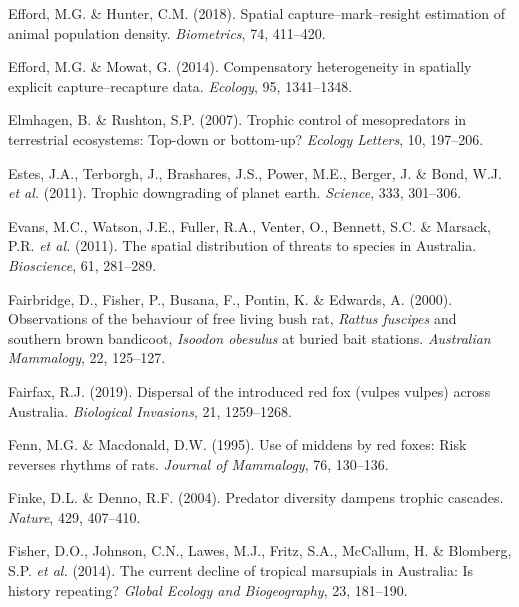 \documentclass[11pt,a4paper,titlepage,twoside,openright]{style/unimelbthesis}
\begin{document}
\begin{mainmatter}
\leavevmode\hypertarget{ref-efford2018spatial}{}%
Efford, M.G. \& Hunter, C.M. (2018). Spatial capture--mark--resight estimation of animal population density. \emph{Biometrics}, 74, 411--420.

\leavevmode\hypertarget{ref-efford2014compensatory}{}%
Efford, M.G. \& Mowat, G. (2014). Compensatory heterogeneity in spatially explicit capture--recapture data. \emph{Ecology}, 95, 1341--1348.

\leavevmode\hypertarget{ref-elmhagen2007trophic}{}%
Elmhagen, B. \& Rushton, S.P. (2007). Trophic control of mesopredators in terrestrial ecosystems: Top-down or bottom-up? \emph{Ecology Letters}, 10, 197--206.

\leavevmode\hypertarget{ref-estes2011trophic}{}%
Estes, J.A., Terborgh, J., Brashares, J.S., Power, M.E., Berger, J. \& Bond, W.J. \emph{et al.} (2011). Trophic downgrading of planet earth. \emph{Science}, 333, 301--306.

\leavevmode\hypertarget{ref-evans2011spatial}{}%
Evans, M.C., Watson, J.E., Fuller, R.A., Venter, O., Bennett, S.C. \& Marsack, P.R. \emph{et al.} (2011). The spatial distribution of threats to species in Australia. \emph{Bioscience}, 61, 281--289.

\leavevmode\hypertarget{ref-fairbridge2000observations}{}%
Fairbridge, D., Fisher, P., Busana, F., Pontin, K. \& Edwards, A. (2000). Observations of the behaviour of free living bush rat, \emph{Rattus fuscipes} and southern brown bandicoot, \emph{Isoodon obesulus} at buried bait stations. \emph{Australian Mammalogy}, 22, 125--127.

\leavevmode\hypertarget{ref-fairfax2019dispersal}{}%
Fairfax, R.J. (2019). Dispersal of the introduced red fox (vulpes vulpes) across Australia. \emph{Biological Invasions}, 21, 1259--1268.

\leavevmode\hypertarget{ref-fenn1995use}{}%
Fenn, M.G. \& Macdonald, D.W. (1995). Use of middens by red foxes: Risk reverses rhythms of rats. \emph{Journal of Mammalogy}, 76, 130--136.

\leavevmode\hypertarget{ref-finke2004predator}{}%
Finke, D.L. \& Denno, R.F. (2004). Predator diversity dampens trophic cascades. \emph{Nature}, 429, 407--410.

\leavevmode\hypertarget{ref-fisher2014current}{}%
Fisher, D.O., Johnson, C.N., Lawes, M.J., Fritz, S.A., McCallum, H. \& Blomberg, S.P. \emph{et al.} (2014). The current decline of tropical marsupials in Australia: Is history repeating? \emph{Global Ecology and Biogeography}, 23, 181--190.


\end{mainmatter}
\end{document}
